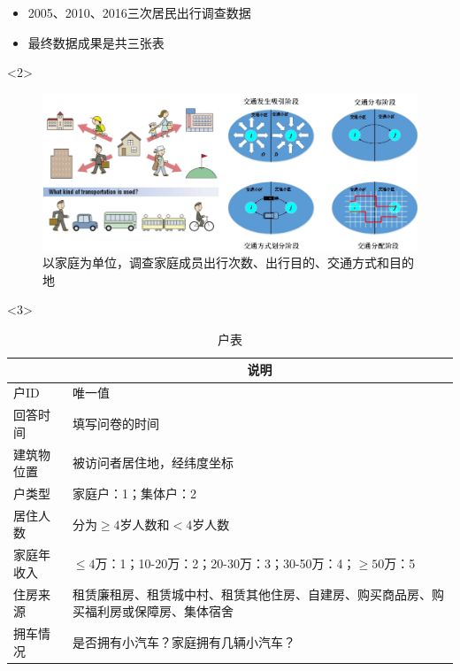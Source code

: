 \documentclass{beamerthemeMono}
\begin{document}
\begin{frame}[t]{\subsecname}
\begin{itemize}
\item<2-> 2005、2010、2016三次居民出行调查数据
\item<3-> 最终数据成果是共三张表
\end{itemize}

\begin{overlayarea}{\textwidth}{\textheight}
  \begin{onlyenv}<2>
\begin{figure}
  \centering
  \includegraphics[width=\textwidth]{chp01_居民出行调查.jpg}
  \caption{以家庭为单位，调查家庭成员出行次数、出行目的、交通方式和目的地}
\end{figure}
  \end{onlyenv}

\begin{onlyenv}<3>
  \begin{table} \centering \footnotesize
    \begin{tabular}{|>{\centering\arraybackslash} m{}|m{}|}
      \toprule
      \rowcolor{LightCyan}
      \multicolumn{1}{|c|}{\textbf{主要字段}} & \multicolumn{1}{c|}{\textbf{说明}} \\\hline
      户ID & 唯一值\\\hline
      回答时间 & 填写问卷的时间\\\hline
      建筑物位置 & 被访问者居住地，经纬度坐标\\\hline
      户类型 & 家庭户：1；集体户：2\\\hline
      居住人数 & 分为$\geq{4}$岁人数和$<4$岁人数\\\hline
      家庭年收入 & $\leq{4}$万：1；10-20万：2；20-30万：3；30-50万：4；$\geq{50}$万：5\\\hline
      住房来源 & 租赁廉租房、租赁城中村、租赁其他住房、自建房、购买商品房、购买福利房或保障房、集体宿舍\\\hline
      拥车情况 & 是否拥有小汽车？家庭拥有几辆小汽车？\\\hline
      \bottomrule
    \end{tabular}
    \caption{户表}
  \end{table}
\end{onlyenv}


\end{overlayarea}
\end{frame}
\end{document}
